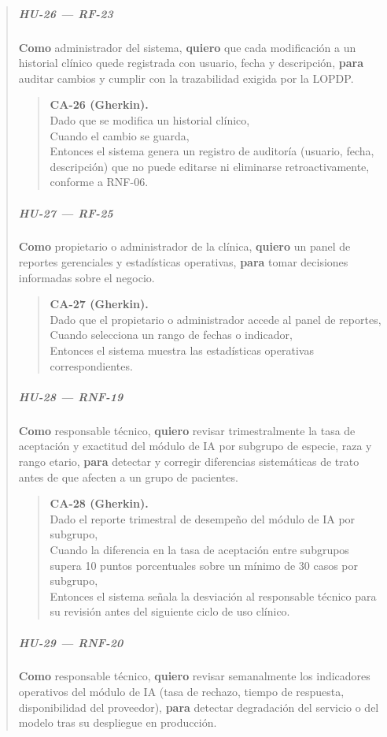 \documentclass[
]{article}
\begin{document}
\begin{quote}
\subparagraph{HU-26 --- RF-23}
\textbf{Como} administrador del sistema,
\textbf{quiero} que cada modificación a un historial clínico quede registrada con usuario, fecha y descripción,
\textbf{para} auditar cambios y cumplir con la trazabilidad exigida por la LOPDP.

\begin{quote}
\textbf{CA-26 (Gherkin).} \\
Dado que se modifica un historial clínico, \\
Cuando el cambio se guarda, \\
Entonces el sistema genera un registro de auditoría (usuario, fecha, descripción) que no puede editarse ni eliminarse retroactivamente, conforme a RNF-06.
\end{quote}

\subparagraph{HU-27 --- RF-25}
\textbf{Como} propietario o administrador de la clínica,
\textbf{quiero} un panel de reportes gerenciales y estadísticas operativas,
\textbf{para} tomar decisiones informadas sobre el negocio.

\begin{quote}
\textbf{CA-27 (Gherkin).} \\
Dado que el propietario o administrador accede al panel de reportes, \\
Cuando selecciona un rango de fechas o indicador, \\
Entonces el sistema muestra las estadísticas operativas correspondientes.
\end{quote}
\subparagraph{HU-28 --- RNF-19}
\textbf{Como} responsable técnico,
\textbf{quiero} revisar trimestralmente la tasa de aceptación y exactitud del módulo de IA por subgrupo de especie, raza y rango etario,
\textbf{para} detectar y corregir diferencias sistemáticas de trato antes de que afecten a un grupo de pacientes.

\begin{quote}
\textbf{CA-28 (Gherkin).} \\
Dado el reporte trimestral de desempeño del módulo de IA por subgrupo, \\
Cuando la diferencia en la tasa de aceptación entre subgrupos supera 10 puntos porcentuales sobre un mínimo de 30 casos por subgrupo, \\
Entonces el sistema señala la desviación al responsable técnico para su revisión antes del siguiente ciclo de uso clínico.
\end{quote}

\subparagraph{HU-29 --- RNF-20}
\textbf{Como} responsable técnico,
\textbf{quiero} revisar semanalmente los indicadores operativos del módulo de IA (tasa de rechazo, tiempo de respuesta, disponibilidad del proveedor),
\textbf{para} detectar degradación del servicio o del modelo tras su despliegue en producción.


\end{quote}
\end{document}

